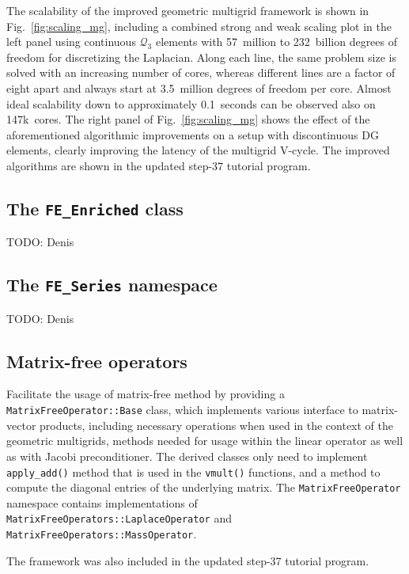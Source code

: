 \documentclass{ansarticle-preprint}
\begin{document}
The scalability of the improved geometric multigrid framework is shown in
Fig.~\ref{fig:scaling_mg}, including a combined strong and weak scaling plot
in the left panel using continuous $\mathcal Q_3$ elements with 57~million to
232~billion degrees of freedom for discretizing the Laplacian. Along each
line, the same problem size is solved with an increasing number of cores,
whereas different lines are a factor of eight apart and always start at
3.5~million degrees of freedom per core. Almost ideal scalability down to
approximately 0.1~seconds can be observed also on 147k~cores. The right panel
of Fig.~\ref{fig:scaling_mg} shows the effect of the aforementioned
algorithmic improvements on a setup with discontinuous DG elements, clearly
improving the latency of the multigrid V-cycle. The improved algorithms are
shown in the updated step-37 tutorial program.



\subsection{The \texttt{FE\_Enriched} class}

TODO: Denis

\subsection{The \texttt{FE\_Series} namespace}

TODO: Denis

\subsection{Matrix-free operators}

Facilitate the usage of matrix-free method by providing a \verb!MatrixFreeOperator::Base! class,
which implements various interface to matrix-vector products, including necessary operations when used in
the context of the geometric multigrids, methods needed for usage within the linear operator as well as with Jacobi preconditioner.
The derived classes only need to implement \verb!apply_add()! method that is
used in the \verb!vmult()! functions, and a method to compute the diagonal entries of the underlying matrix.
The \verb!MatrixFreeOperator! namespace contains implementations of \verb!MatrixFreeOperators::LaplaceOperator! and
\verb!MatrixFreeOperators::MassOperator!.

The framework was also included in the updated step-37 tutorial program.
\end{document}
